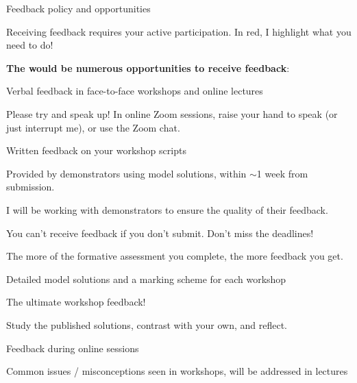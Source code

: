 \begin{frame}{Feedback policy and opportunities}

{\color{red} \scriptsize Receiving feedback requires your active participation. In red, I highlight what you need to do!}\\

\vspace{0.1cm}

{\bf The would be numerous opportunities to receive feedback}:

\begin{itemize}
{\small
  \item Verbal feedback in face-to-face workshops and online lectures
  \begin{itemize}
  {\scriptsize
    \item {\color{red}Please try and speak up! In online Zoom sessions, raise your hand to speak (or just interrupt me), or use the Zoom chat.}
  }
  \end{itemize}

  \item Written feedback on your workshop scripts
  \begin{itemize}
  {\scriptsize
    \item Provided by demonstrators using model solutions, within $\sim$1 week from submission.
    \item I will be working with demonstrators to ensure the quality of their feedback.
    \item {\color{red}You can't receive feedback if you don't submit. Don't miss the deadlines!}
    \item {\color{red}The more of the formative assessment you complete, the more feedback you get.}\\
  }
  \end{itemize}

  \item Detailed model solutions and a marking scheme for each workshop
  \begin{itemize}
  {\scriptsize
    \item The ultimate workshop feedback!
    \item {\color{red}Study the published solutions, contrast with your own, and reflect.}
  }
  \end{itemize}

  \item Feedback during online sessions
  \begin{itemize}
  {\scriptsize
    \item Common issues / misconceptions seen in workshops,
      will be addressed in lectures
  }
  \end{itemize}

}
\end{itemize}
\end{frame}
